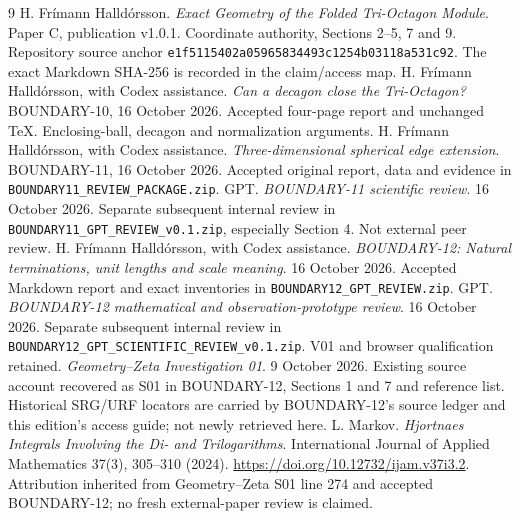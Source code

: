 \documentclass[11pt,a4paper]{article}
\begin{document}
\clearpage
\begin{thebibliography}{9}
 H. Fr\'imann Halld\'orsson. \emph{Exact Geometry of the Folded Tri-Octagon Module}. Paper C, publication v1.0.1. Coordinate authority, Sections 2--5, 7 and 9. Repository source anchor \texttt{e1f5115402a05965834493c1254b03118a531c92}. The exact Markdown SHA-256 is recorded in the claim/access map.
 H. Fr\'imann Halld\'orsson, with Codex assistance. \emph{Can a decagon close the Tri-Octagon?} BOUNDARY-10, 16 October 2026. Accepted four-page report and unchanged TeX. Enclosing-ball, decagon and normalization arguments.
 H. Fr\'imann Halld\'orsson, with Codex assistance. \emph{Three-dimensional spherical edge extension}. BOUNDARY-11, 16 October 2026. Accepted original report, data and evidence in \texttt{BOUNDARY11\_REVIEW\_PACKAGE.zip}.
 GPT. \emph{BOUNDARY-11 scientific review}. 16 October 2026. Separate subsequent internal review in \texttt{BOUNDARY11\_GPT\_REVIEW\_v0.1.zip}, especially Section 4. Not external peer review.
 H. Fr\'imann Halld\'orsson, with Codex assistance. \emph{BOUNDARY-12: Natural terminations, unit lengths and scale meaning}. 16 October 2026. Accepted Markdown report and exact inventories in \texttt{BOUNDARY12\_GPT\_REVIEW.zip}.
 GPT. \emph{BOUNDARY-12 mathematical and observation-prototype review}. 16 October 2026. Separate subsequent internal review in \texttt{BOUNDARY12\_GPT\_SCIENTIFIC\_REVIEW\_v0.1.zip}. V01 and browser qualification retained.
 \emph{Geometry--Zeta Investigation 01}. 9 October 2026. Existing source account recovered as S01 in BOUNDARY-12, Sections 1 and 7 and reference list. Historical SRG/URF locators are carried by BOUNDARY-12's source ledger and this edition's access guide; not newly retrieved here.
 L. Markov. \emph{Hjortnaes Integrals Involving the Di- and Trilogarithms}. International Journal of Applied Mathematics 37(3), 305--310 (2024). \url{https://doi.org/10.12732/ijam.v37i3.2}. Attribution inherited from Geometry--Zeta S01 line 274 and accepted BOUNDARY-12; no fresh external-paper review is claimed.
\end{thebibliography}
\end{document}
